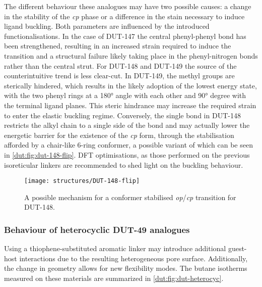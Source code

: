 The different behaviour these analogues may have two possible
causes: a change in the stability of the \textit{cp} phase or a 
difference in the stain necessary to induce ligand buckling. Both
parameters are influenced by the introduced functionalisations. 
In the case of DUT-147 the central phenyl-phenyl bond
has been strengthened, resulting in an increased strain required to
induce the transition and a structural failure likely taking place 
in the phenyl-nitrogen bonds rather than the central strut. 
For DUT-148 and DUT-149 the source of the 
counterintuitive trend is less clear-cut. In DUT-149, the methyl
groups are sterically hindered, which results in the likely
adoption of the lowest energy state, with the two phenyl rings
at a \ang{180} angle with each other and \ang{90} degree with the
terminal ligand planes.
This steric hindrance may increase the required strain to 
enter the elastic buckling regime. Conversely, the 
single bond in DUT-148 restricts the alkyl chain to a single 
side of the bond and may actually lower the energetic barrier for
the existence of the \textit{cp} form, through the stabilisation
afforded by a chair-like 6-ring conformer, a possible variant 
of which can be seen in \autoref{dut:fig:dut-148-flip}. 
DFT optimisations, as those performed on the previous isoreticular
linkers are recommended to shed light on the buckling behaviour.

\begin{figure}[htb]
    \centering
    \texttt{[image: structures/DUT-148-flip]}%
    \caption{A possible mechanism for a conformer stabilised 
    \textit{op}/\textit{cp} transition for DUT-148.}%
    \label{dut:fig:dut-148-flip}
\end{figure}

\subsubsection{Behaviour of heterocyclic DUT-49 analogues}

Using a thiophene-substituted aromatic linker may introduce additional
guest-host interactions due to the resulting heterogeneous pore
surface. Additionally, the change in geometry allows for new 
flexibility modes. The butane isotherms measured on these materials
are summarized in \autoref{dut:fig:dut-heterocyc}.


